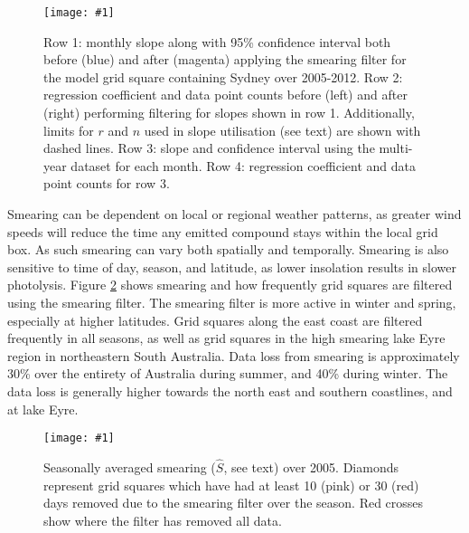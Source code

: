 \documentclass[acp, manuscript]{copernicus}
\newcommand{\mypic}[3]{%
  \begin{figure}
    \texttt{[image: \#1]}
    \caption{#2}
    #3
  \end{figure}
}
\begin{document}
    
    \mypic{Figures/GC/slope_series_Syd_20050101-20121231.png}{%
      Row 1: monthly slope along with 95\% confidence interval both before (blue) and after (magenta) applying the smearing filter for the model grid square containing Sydney over 2005-2012. 
      Row 2: regression coefficient and data point counts before (left) and after (right) performing filtering for slopes shown in row 1.
      Additionally, limits for $r$ and $n$ used in slope utilisation (see text) are shown with dashed lines.
      Row 3: slope and confidence interval using the multi-year dataset for each month.
      Row 4: regression coefficient and data point counts for row 3.
    }{\label{BioIsop:method:slope:fig_smear_filter_prior}}
    
    Smearing can be dependent on local or regional weather patterns, as greater wind speeds will reduce the time any emitted compound stays within the local grid box.
    As such smearing can vary both spatially and temporally.
    Smearing is also sensitive to time of day, season, and latitude, as lower insolation results in slower photolysis.
    Figure \ref{BioIsop:method:smearing:fig_smearing_def_2005} shows smearing and how frequently grid squares are filtered using the smearing filter.
    The smearing filter is more active in winter and spring, especially at higher latitudes.
    Grid squares along the east coast are filtered frequently in all seasons, as well as grid squares in the high smearing lake Eyre region in northeastern South Australia.
    Data loss from smearing is approximately 30\% over the entirety of Australia during summer, and 40\% during winter.
    The data loss is generally higher towards the north east and southern coastlines, and at lake Eyre.
    
    \mypic{Figures/Filters/smearing_effects_2005.png}{%
      Seasonally averaged smearing ($\hat{S}$, see text) over 2005.
      Diamonds represent grid squares which have had at least 10 (pink) or 30 (red) days removed due to the smearing filter over the season.
      Red crosses show where the filter has removed all data.
    }{\label{BioIsop:method:smearing:fig_smearing_def_2005}}
    
\end{document}
